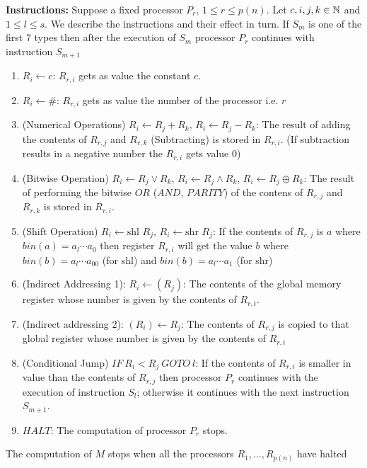 \begin{definition}
	\textbf{Instructions:} Suppose a fixed processor $P_r$, $1\leq r\leq p(n)$. Let $c,i,j,k\in \mathbb{N}$ and $1\leq l\leq s$. We describe the instructions and their effect in turn. If $S_m$ is one of the first 7 types then after the execution of $S_m$ processor $P_r$ continues with instruction $S_{m+1}$\begin{enumerate}
		\item $R_i\leftarrow c$: $R_{r,i}$ gets as value the constant $c$.
		\item $R_i\leftarrow\#$: $R_{r,i}$ gets as value the number of the processor i.e. $r$
		\item (Numerical Operations) $R_i\leftarrow R_j+R_k$, $R_i\leftarrow R_j-R_k$: The result of adding the contents of $R_{r,j}$ and $R_{r,k}$ (Subtracting) is stored in $R_{r,i}$. (If subtraction results in a negative number the $R_{r,i}$ gets value 0)
		\item (Bitwise Operation) $R_i\leftarrow R_j\vee R_k$, $R_i\leftarrow R_j\wedge R_k$, $R_i\leftarrow R_j\oplus R_k$: The result of performing the bitwise $OR$ ($AND$, $PARITY$) of the contens of $R_{r,j}$ and $R_{r,k}$ is stored in $R_{r,i}$.
	\item (Shift Operation) $R_i\leftarrow \text{shl }R_j$, $R_i\leftarrow \text{shr }R_j$: If the contents of $R_{r,j}$ is $a$ where $bin (a)=a_{l}\cdots a_0$ then register $R_{r,i}$ will get the value $b$ where $bin(b)=a_l\cdots a_00$ (for shl) and $bin(b)=a_l\cdots a_1$ (for shr)
	\item (Indirect Addressing 1): $R_i\leftarrow (R_j)$: The contents of the global memory register whose number is given by the contents of $R_{r,i}$.
	\item (Indirect addressing 2): $(R_i)\leftarrow R_j$: The contents of $R_{r,j}$ is copied to that global register whose number is given by the contents of $R_{r,i}$
	\item (Conditional Jump) $IF\ R_i<R_j\ GOTO\ l$: If the contents of $R_{r,i}$ is smaller in value than the contents of $R_{r,j}$ then processor $P_r$ continues with the execution of instruction $S_l$; otherwise it continues with the next instruction $S_{m+1}$.
	\item $HALT$: The computation of processor $P_r$ stops.
	\end{enumerate}
The computation of $M$ stops when all the processors $R_1,\dots, R_{p(n)}$ have halted
\end{definition}

